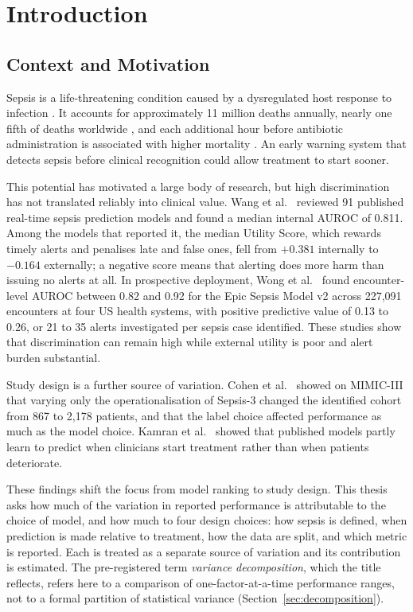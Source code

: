 \chapter{Introduction}
\label{ch:introduction}


\section{Context and Motivation}

Sepsis is a life-threatening condition caused by a dysregulated host response
to infection \cite{singer2016sepsis3}. It accounts for approximately 11 million
deaths annually, nearly one fifth of deaths worldwide \cite{rudd2020global},
and each additional hour before antibiotic administration is associated with
higher mortality \cite{seymour2017time}. An early warning system that detects
sepsis before clinical recognition could allow treatment to start sooner.

This potential has motivated a large body of research, but high
discrimination has not translated reliably into clinical value. Wang et al.\
\cite{wang2025srpm} reviewed 91 published real-time sepsis prediction models
and found a median internal AUROC of 0.811. Among the models that reported it,
the median Utility Score, which rewards timely alerts and penalises late and
false ones, fell from $+0.381$ internally to $-0.164$ externally; a negative
score means that alerting does more harm than issuing no alerts at all. In
prospective deployment, Wong et al.\ \cite{wong2026epic} found encounter-level
AUROC between 0.82 and 0.92 for the Epic Sepsis Model v2 across 227,091
encounters at four US health systems, with positive predictive value of 0.13
to 0.26, or 21 to 35 alerts investigated per sepsis case identified. These
studies show that discrimination can remain high while external utility is
poor and alert burden substantial.

Study design is a further source of variation. Cohen et al.\
\cite{cohen2024subtle} showed on MIMIC-III that varying only the
operationalisation of Sepsis-3 changed the identified cohort from 867 to 2,178
patients, and that the label choice affected performance as much as the model
choice. Kamran et al.\ \cite{kamran2024evaluation} showed that published models
partly learn to predict when clinicians start treatment rather than when
patients deteriorate.

These findings shift the focus from model ranking to study design. This thesis
asks how much of the variation in reported performance is attributable to the
choice of model, and how much to four design choices: how sepsis is defined,
when prediction is made relative to treatment, how the data are split, and
which metric is reported. Each is treated as a separate source of variation
and its contribution is estimated. The pre-registered term \emph{variance
decomposition}, which the title reflects, refers here to a comparison of
one-factor-at-a-time performance ranges, not to a formal partition of
statistical variance (Section~\ref{sec:decomposition}).


